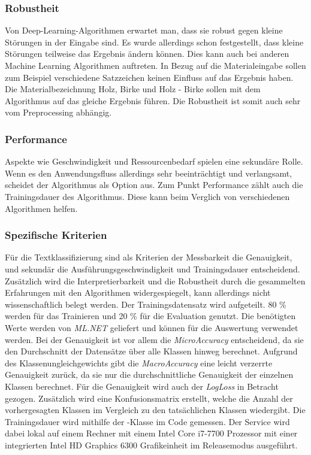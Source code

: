 \subsubsection{Robustheit}

Von Deep-Learning-Algorithmen erwartet man, dass sie robust gegen kleine Störungen in der Eingabe sind. Es wurde allerdings schon festgestellt, dass kleine Störungen teilweise das Ergebnis ändern können. \citep[vgl.][]{Szegedy_2013} Dies kann auch bei anderen Machine Learning Algorithmen auftreten. In Bezug auf die Materialeingabe sollen zum Beispiel verschiedene Satzzeichen keinen Einfluss auf das Ergebnis haben. Die Materialbezeichnung \glqq Holz, Birke\grqq{} und \glqq Holz - Birke\grqq{} sollen mit dem Algorithmus auf das gleiche Ergebnis führen. Die Robustheit ist somit auch sehr vom Preprocessing abhängig.

\subsubsection{Performance}

Aspekte wie Geschwindigkeit und Ressourcenbedarf spielen eine sekundäre Rolle. Wenn es den Anwendungsfluss allerdings sehr beeinträchtigt und verlangsamt, scheidet der Algorithmus als Option aus. Zum Punkt Performance zählt auch die Trainingsdauer des Algorithmus. Diese kann beim Verglich von verschiedenen Algorithmen helfen.\\

\subsubsection{Spezifische Kriterien}

Für die Textklassifizierung sind als Kriterien der Messbarkeit die Genauigkeit, und sekundär die Ausführungsgeschwindigkeit und Trainingsdauer entscheidend. Zusätzlich wird die Interpretierbarkeit und die Robustheit durch die gesammelten Erfahrungen mit den Algorithmen widergespiegelt, kann allerdings nicht wissenschaftlich belegt werden.
Der Trainingsdatensatz wird aufgeteilt. 80 \% werden für das Trainieren und 20 \% für die Evaluation genutzt. Die benötigten Werte werden von \textit{ML.NET} geliefert und können für die Auswertung verwendet werden. Bei der Genauigkeit ist vor allem die \textit{MicroAccuracy} entscheidend, da sie den Durchschnitt der Datensätze über alle Klassen hinweg berechnet. Aufgrund des Klassenungleichgewichts gibt die \textit{MacroAccuracy} eine leicht verzerrte Genauigkeit zurück, da sie nur die durchschnittliche Genauigkeit der einzelnen Klassen berechnet. Für die Genauigkeit wird auch der \textit{LogLoss} in Betracht gezogen. Zusätzlich wird eine Konfusionsmatrix erstellt, welche die Anzahl der vorhergesagten Klassen im Vergleich zu den tatsächlichen Klassen wiedergibt. \citep[vgl.][]{metrics_doc}
Die Trainingsdauer wird mithilfe der -Klasse im Code gemessen. Der Service wird dabei lokal auf einem Rechner mit einem Intel Core i7-7700 Prozessor mit einer integrierten Intel HD Graphics 6300 Grafikeinheit im Releasemodus ausgeführt.

